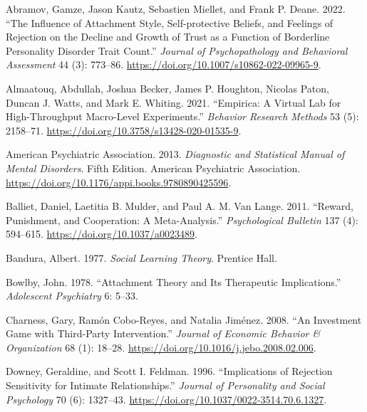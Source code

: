 \documentclass[
]{article}
\newlength{\cslhangindent}
\newenvironment{CSLReferences}[2] %
 {\begin{list}{}{%
  \setlength{\itemindent}{0pt}
  \setlength{\leftmargin}{0pt}
  \setlength{\parsep}{0pt}
  \ifodd #1
   \setlength{\leftmargin}{\cslhangindent}
   \setlength{\itemindent}{-1\cslhangindent}
  \fi
  \setlength{\itemsep}{#2\baselineskip}}}
 {\end{list}}
\begin{document}
\label{refs}
\begin{CSLReferences}{1}{0}
Abramov, Gamze, Jason Kautz, Sebastien Miellet, and Frank P. Deane. 2022. {``The {Influence} of {Attachment Style}, {Self-protective Beliefs}, and {Feelings} of {Rejection} on the {Decline} and {Growth} of {Trust} as a {Function} of {Borderline Personality Disorder Trait Count}.''} \emph{Journal of Psychopathology and Behavioral Assessment} 44 (3): 773--86. \url{https://doi.org/10.1007/s10862-022-09965-9}.

Almaatouq, Abdullah, Joshua Becker, James P. Houghton, Nicolas Paton, Duncan J. Watts, and Mark E. Whiting. 2021. {``Empirica: A Virtual Lab for High-Throughput Macro-Level Experiments.''} \emph{Behavior Research Methods} 53 (5): 2158--71. \url{https://doi.org/10.3758/s13428-020-01535-9}.

American Psychiatric Association. 2013. \emph{Diagnostic and {Statistical Manual} of {Mental Disorders}}. Fifth Edition. American Psychiatric Association. \url{https://doi.org/10.1176/appi.books.9780890425596}.

Balliet, Daniel, Laetitia B. Mulder, and Paul A. M. Van Lange. 2011. {``Reward, Punishment, and Cooperation: {A} Meta-Analysis.''} \emph{Psychological Bulletin} 137 (4): 594--615. \url{https://doi.org/10.1037/a0023489}.

Bandura, Albert. 1977. \emph{Social {Learning Theory}}. Prentice Hall.

Bowlby, John. 1978. {``Attachment Theory and Its Therapeutic Implications.''} \emph{Adolescent Psychiatry} 6: 5--33.

Charness, Gary, Ramón Cobo-Reyes, and Natalia Jiménez. 2008. {``An Investment Game with Third-Party Intervention.''} \emph{Journal of Economic Behavior \& Organization} 68 (1): 18--28. \url{https://doi.org/10.1016/j.jebo.2008.02.006}.

Downey, Geraldine, and Scott I. Feldman. 1996. {``Implications of Rejection Sensitivity for Intimate Relationships.''} \emph{Journal of Personality and Social Psychology} 70 (6): 1327--43. \url{https://doi.org/10.1037/0022-3514.70.6.1327}.


\end{CSLReferences}
\end{document}
